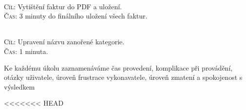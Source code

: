 \documentclass[11pt,a4paper]{article}
\begin{document}
\\
\textsc{Cíl}: Vytištění faktur do PDF a uložení.\\
\textsc{Čas}: 3 minuty do finálního uložení všech faktur.\\
\bigskip

\\
\textsc{Cíl}: Upravení názvu zanořené kategorie.\\
\textsc{Čas}: 1 minuta.\\
\bigskip

\noindent Ke každému úkolu zaznamenáváme čas provedení, komplikace při provádění, otázky uživatele, úroveň frustrace vykonavatele, úroveň zmatení a spokojenost s výsledkem


<<<<<<< HEAD
\end{document}

